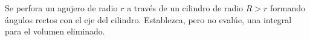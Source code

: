 \item Se perfora un agujero de radio $r$ a través de un cilindro de radio $R > r$ formando ángulos rectos con el eje del cilindro. Establezca, pero no evalúe, una integral para el volumen eliminado.
